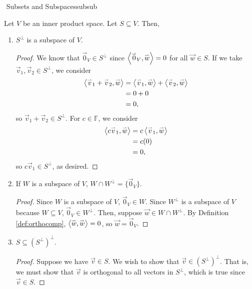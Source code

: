         \begin{theorem}{\Stop\,\,Subsets and Subspaces}{subsub}

            Let \(V\) be an inner product space. Let \(S\subseteq V\). Then,
            \begin{enumerate}
                \item \(S^\perp\) is a subspace of \(V\).
                \begin{proof}
                    We know that \(\vec{0}_V\in S^\perp\) since \(\left\langle \overset{_{\rightharpoonup}}{0}_V,\overset{_{\rightharpoonup}}{w}\right\rangle=0\) for all \(\vec{w}\in S\). If we take \(\vec{v}_1,\vec{v}_2\in S^\perp\), we consider
                    \begin{align*}
                        \left\langle \overset{_{\rightharpoonup}}{v}_1+\overset{_{\rightharpoonup}}{v}_2,\overset{_{\rightharpoonup}}{w}\right\rangle&=\left\langle \overset{_{\rightharpoonup}}{v}_1,\overset{_{\rightharpoonup}}{w}\right\rangle+\left\langle \overset{_{\rightharpoonup}}{v}_2,\overset{_{\rightharpoonup}}{w}\right\rangle \\
                        &=0+0 \\
                        &=0,
                    \end{align*}
                    so \(\vec{v}_1+\vec{v}_2\in S^\perp\). For \(c\in\mathbb{F}\), we consider
                    \begin{align*}
                        \left\langle c\overset{_{\rightharpoonup}}{v}_1,\overset{_{\rightharpoonup}}{w}\right\rangle&=c\left\langle \overset{_{\rightharpoonup}}{v}_1,\overset{_{\rightharpoonup}}{w}\right\rangle \\
                        &=c(0) \\
                        &=0,
                    \end{align*}
                    so \(c\vec{v}_1\in S^\perp\), as desired.
                \end{proof}
                \item If \(W\) is a subspace of \(V\), \(W\cap W^\perp=\{\vec{0}_V\}\).
                \begin{proof}
                    Since \(W\) is a subspace of \(V\), \(\vec{0}_V\in W\). Since \(W^\perp\) is a subspace of \(V\) because \(W\subseteq V\), \(\vec{0}_V\in W^\perp\). Then, suppose \(\vec{w}\in W\cap W^\perp\). By Definition \ref{def:orthocomp}, \(\left\langle \overset{_{\rightharpoonup}}{w},\overset{_{\rightharpoonup}}{w}\right\rangle=0\), so \(\vec{w}=\vec{0}_V\).
                \end{proof}
                \item \(S\subseteq (S^\perp)^\perp\).
                \begin{proof}
                    Suppose we have \(\vec{v}\in S\). We wish to show that \(\vec{v}\in (S^{\perp})^\perp\). That is, we must show that \(\vec{v}\) is orthogonal to all vectors in \(S^\perp\), which is true since \(\vec{v}\in S\).
                \end{proof}
            \end{enumerate}
            
        \end{theorem}
